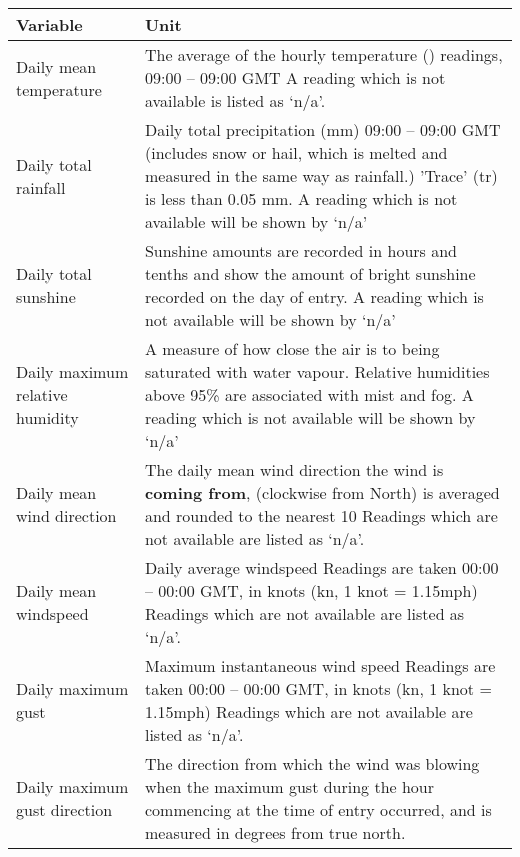 \begin{tabular}{|p{5.5cm}|p{11.5cm}|}
	\hline
	\textbf{Variable} & \textbf{Unit} \\
	\hline
	Daily mean temperature & The average of the hourly temperature (\textcelsius) readings, 09:00 – 09:00 GMT \newline A reading which is not available is listed as ‘n/a’.
	\\
	\hline
	Daily total rainfall & Daily total precipitation (mm) 09:00 – 09:00 GMT
	(includes snow or hail, which is melted and measured in the same way as rainfall.) \newline
	'Trace' (tr) is less than 0.05 mm. \newline A reading which is not available will be shown by ‘n/a’
	\\
	\hline
	Daily total sunshine & Sunshine amounts are recorded in hours and tenths and show the amount of bright sunshine recorded on the day of entry. \newline A reading which is not available will be shown by ‘n/a’ \\
	\hline
	Daily maximum relative humidity & A measure of how close the air is to being saturated with water vapour. \newline Relative humidities above 95\% are associated with mist and fog. \newline A reading which is not available will be shown by ‘n/a’
	\\
	\hline
	Daily mean wind direction & The daily mean wind direction the wind is \textbf{coming from}, (clockwise from North) is averaged and rounded to the nearest 10\textdegree \newline
	Readings which are not available are listed as ‘n/a’.
	\\
	\hline
	Daily mean windspeed & Daily average windspeed \newline Readings are taken 00:00 – 00:00 GMT, in knots (kn, 1 knot = 1.15mph) \newline
	Readings which are not available are listed as ‘n/a’. \\
	\hline
	Daily maximum gust & Maximum instantaneous wind speed \newline Readings are taken 00:00 – 00:00 GMT, in knots (kn, 1 knot = 1.15mph) \newline
	Readings which are not available are listed as ‘n/a’.  \\
	\hline
	Daily maximum gust direction & The direction from which the wind was blowing when the maximum gust during the hour commencing at the time of entry occurred, and is measured in degrees from true north.  \newline

\end{tabular}
